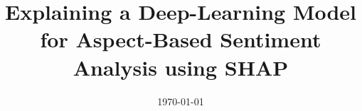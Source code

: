 \documentclass[openany]{mthesis.style}		%
\begin{document}
\frontmatter
\title{Explaining a Deep-Learning Model for Aspect-Based Sentiment Analysis using SHAP}
\addresses{\\\deptname\\\univname}
\date{\today}


\maketitle

\mainmatter





%

\newpage

\tableofcontents

\newpage

%


\cfoot{\thepage}
\lhead[\leftmark]{}
\rhead[]{\leftmark}

%











\backmatter



\appendix

\end{document}
